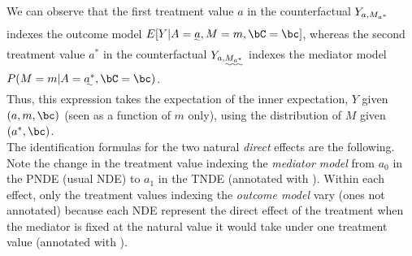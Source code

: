 \documentclass[10pt]{article}
\begin{document}
We can observe that the first treatment value \(a\) in the counterfactual \(Y_{\uwave{a},M_{a^{*}}}\) indexes the outcome model \(E[Y | A = \uwave{a}, M = m, \bC = \bc]\), whereas the second treatment value \(a^{*}\) in the counterfactual \(Y_{a,\uwave{M_{a^{*}}}}\) indexes the mediator model \(P(M = m | A = \uwave{a^{*}}, \bC = \bc)\).\\

Thus, this expression takes the expectation of the inner expectation, \(Y\) given \((a,m,\bc)\) (seen as a function of \(m\) only), using the distribution of \(M\) given \((a^{*},\bc)\).\\

The identification formulas for the two natural \emph{direct} effects are the following. Note the change in the treatment value indexing the \emph{mediator model} from \(a_{0}\) in the PNDE (usual NDE) to \(a_{1}\) in the TNDE (annotated with \uwave{~~~~}). Within each effect, only the treatment values indexing the \emph{outcome model} vary (ones not annotated) because each NDE represent the direct effect of the treatment when the mediator is fixed at the natural value it would take under one treatment value (annotated with \uwave{~~~~}).
\end{document}
